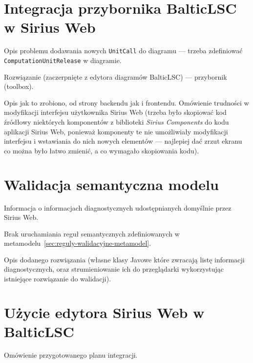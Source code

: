 \section{Integracja przybornika BalticLSC w Sirius Web}

Opis problemu dodawania nowych \texttt{UnitCall} do diagramu --- trzeba
zdefiniować \texttt{ComputationUnitRelease} w diagramie.

Rozwiązanie (zaczerpnięte z edytora diagramów BalticLSC) --- przybornik
(toolbox).

Opis jak to zrobiono, od strony backendu jak i frontendu. Omówienie trudności w
modyfikacji interfejsu użytkownika Sirius Web (trzeba było skopiować kod
źródłowy niektórych komponentów z biblioteki \textit{Sirius Components} do kodu
aplikacji Sirius Web, ponieważ komponenty te nie umożliwiały modyfikacji
interfejsu i wstawiania do nich nowych elementów --- najlepiej dać zrzut ekranu
co można było łatwo zmienić, a co wymagało skopiowania kodu).

\section{Walidacja semantyczna modelu}

Informacja o informacjach diagnostycznych udostępnianych domyślnie przez Sirius
Web.

Brak uruchamiania reguł semantycznych zdefiniowanych w
metamodelu~\ref{sec:reguly-walidacyjne-metamodel}.

Opis dodanego rozwiązania (własne klasy Javowe które zwracają listę informacji
diagnostycznych, oraz strumieniowanie ich do przeglądarki wykorzystując
istniejące rozwiązanie do walidacji).

\section{Użycie edytora Sirius Web w BalticLSC}

Omówienie przygotowanego planu integracji.
